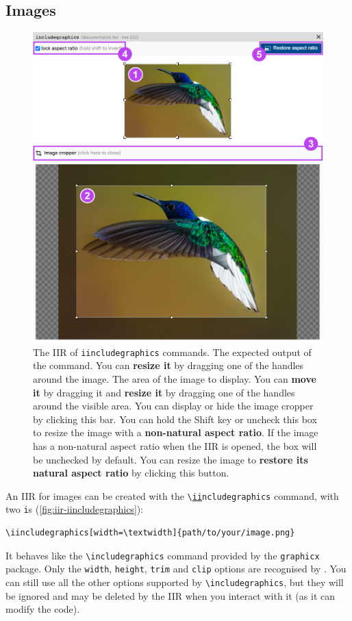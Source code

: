 \newpage
\subsection{Images}

\begin{figure}[h!]
    \centering
    \includegraphics[width = .6\textwidth]{img/iir-iincludegraphics.png}
    \caption{The IIR of \texttt{iincludegraphics} commands.  The expected output of the command. You can \textbf{resize it} by dragging one of the handles around the image.  The area of the image to display. You can \textbf{move it} by dragging it and \textbf{resize it} by dragging one of the handles around the visible area.  You can display or hide the image cropper by clicking this bar.  You can hold the Shift key or uncheck this box to resize the image with a \textbf{non-natural aspect ratio}. If the image has a non-natural aspect ratio when the IIR is opened, the box will be unchecked by default.  You can resize the image to \textbf{restore its natural aspect ratio} by clicking this button.}
    \label{fig:iir-iincludegraphics}
\end{figure}

An IIR for images can be created with the \verb|\|\underline{\texttt{ii}}\verb|ncludegraphics| command, with two \texttt{i}s (\autoref{fig:iir-iincludegraphics}):

\begin{lstlisting}[style=custom-latex]
\iincludegraphics[width=\textwidth]{path/to/your/image.png}
\end{lstlisting}

It behaves like the \verb|\includegraphics| command provided by the \texttt{graphicx} package.
Only the \texttt{width}, \texttt{height}, \texttt{trim} and \texttt{clip} options are recognised by \iLaTeX{}.
You can still use all the other options supported by \verb|\includegraphics|, but they will be ignored and may be deleted by the IIR when you interact with it (as it can modify the code).

